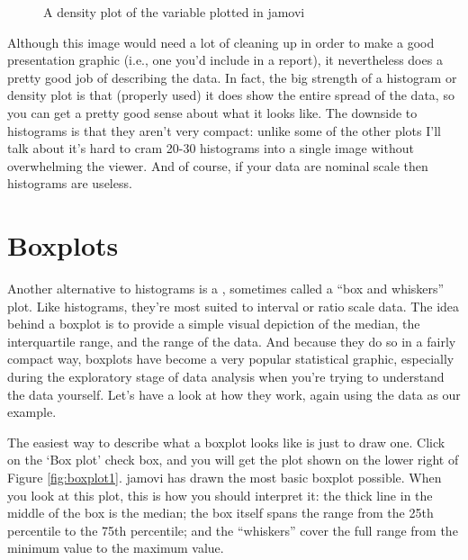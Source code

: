 \begin{figure}[ht]
\begin{center}
\caption{A density plot of the  variable plotted in jamovi}
\label{fig:histogram2}
\HR
\end{center}
\end{figure}

Although this image would need a lot of cleaning up in order to make a good presentation graphic (i.e., one you'd include in a report), it nevertheless does a pretty good job of describing the data. In fact, the big strength of a histogram or density plot is that (properly used) it does show the entire spread of the data, so you can get a pretty good sense about what it looks like. The downside to histograms is that they aren't very compact: unlike some of the other plots I'll talk about it's hard to cram 20-30 histograms into a single image without overwhelming the viewer. And of course, if your data are nominal scale then histograms are useless.


\section{Boxplots~\label{sec:boxplots}}

Another alternative to histograms is a , sometimes called a ``box and whiskers'' plot. Like histograms, they're most suited to interval or ratio scale data. The idea behind a boxplot is to provide a simple visual depiction of the median, the interquartile range, and the range of the data. And because they do so in a fairly compact way, boxplots have become a very popular statistical graphic, especially during the exploratory stage of data analysis when you're trying to understand the data yourself. Let's have a look at how they work, again using the  data as our example. 

The easiest way to describe what a boxplot looks like is just to draw one. Click on the `Box plot' check box, and you will get the plot shown on the lower right of Figure \ref{fig:boxplot1}. jamovi has drawn the most basic boxplot possible. When you look at this plot, this is how you should interpret it: the thick line in the middle of the box is the median; the box itself spans the range from the 25th percentile to the 75th percentile; and the ``whiskers'' cover the full range from the minimum value to the maximum value. 

